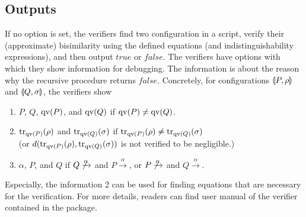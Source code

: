 \subsection{Outputs}
If no option is set, the verifiers find two configuration in a
script, verify their (approximate) bisimilarity using the defined
equations (and indistinguishability expressions),
and then output $\mathit{true}$ or $\mathit{false}$.
The verifiers have options with which they 
show information for debugging.
The information is about
the reason why the recursive procedure returns $\mathit{false}$.
Concretely, for configurations $\llparenthesis P, \rho \rrparenthesis$ and $\llparenthesis Q, \sigma \rrparenthesis$, 
the verifiers show
\begin{enumerate}
 \item $P$, $Q$, $\mathrm{qv}(P)$, and $\mathrm{qv}(Q)$
       if $\mathrm{qv}(P) \neq \mathrm{qv}(Q)$.
 \item ${\rm tr}_{\mathrm{qv}(P)}(\rho)$ and ${\rm tr}_{\mathrm{qv}(Q)}(\sigma)$ if
       ${\rm tr}_{\mathrm{qv}(P)}(\rho) \neq {\rm tr}_{\mathrm{qv}(Q)}(\sigma)$\\
       (or $d({\rm tr}_{\mathrm{qv}(P)}(\rho), {\rm tr}_{\mathrm{qv}(Q)}(\sigma))$ 
       is not verified to be negligible.)
 \item $\alpha$, $P$, and $Q$ if $Q \not\xrightarrow{\alpha}$
       and $P \xrightarrow{\alpha}$, or 
       $P \not\xrightarrow{\alpha}$
       and $Q \xrightarrow{\alpha}$.
\end{enumerate}
Especially, the information 2 can be used for finding equations that are
necessary for the verification.
For more details, readers can find user manual
of the verifier contained in the package.

